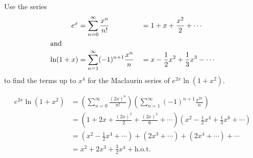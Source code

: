 \documentclass[12pt,answers]{exam}
\newcommand{\inv}{^{-1}}
\begin{document}
\begin{questions}

\newpage
\question[8]
Use the series
\begin{alignat*}{2}
    e^x      & = \sum_{n=0}^\infty \frac{x^n}{n!}
             &                                              & = 1 + x + \frac{x^2}{2} + \cdots         \\
    \intertext{and}
    \ln(1+x) & = \sum_{n=1}^\infty (-1)^{n+1} \frac{x^n}{n}
             &                                              & = x - \frac12 x^2 + \frac13 x^3 - \cdots
\end{alignat*}
to find the terms up to $x^4$ for the Maclaurin series of $e^{2x} \ln(1+x^2)$.
\begin{solution}
\begin{align*}
    e^{2x} \ln(1+x^2) 
    &= \left( \sum_{n=0}^\infty \frac{(2x)^n}{n!} \right) \left( \sum_{n=1}^\infty (-1)^{n+1} \frac{x^{2n}}{n}\right) \\ 
    &= \left(1 + 2x + \frac{(2x)^2}{2} + \frac{(2x)^3}{6} + \cdots \right) \left( x^2 - \frac12 x^{4} + \frac13 x^6 + \cdots \right) \\ 
    &= \left(x^2 - \frac12 x^4 + \cdots \right) + \left(2x^3 + \cdots \right) + \left( 2x^4 + \cdots \right) + \cdots \\ 
    &= \boxed{x^2 + 2x^3 + \frac 32 x^4} + \text{h.o.t.}
\end{align*}
\end{solution}


\end{questions}
\end{document}
